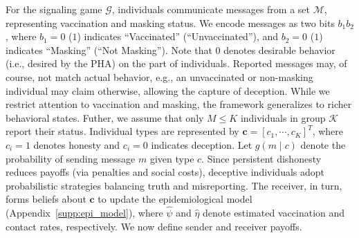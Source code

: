 \documentclass[sigconf,review]{acmart}
\begin{document}
For the signaling game $\mathcal{G}$, individuals communicate messages from a set $\mathcal{M}$, representing vaccination and masking status.
We encode messages as two bits $b_1b_2$, where $b_1=0$ ($1$) indicates ``Vaccinated'' (``Unvaccinated''), and $b_2=0$ ($1$) indicates ``Masking'' (``Not Masking'').
Note that $0$ denotes desirable behavior (i.e., desired by the PHA) on the part of individuals.
Reported messages may, of course, not match actual behavior, e.g., an unvaccinated or non-masking individual may claim otherwise, allowing the
capture of deception.
While we restrict attention to vaccination and masking, the framework generalizes to richer behavioral states.
Futher, we assume that only $M \leq K$ individuals in group $\mathcal{K}$ report their status. Individual types are represented by $\boldsymbol{c} = [c_1,\cdots,c_K]^T$, where $c_i=1$ denotes honesty and $c_i=0$ indicates deception. Let $g(m\mid c)$ denote the probability of sending message $m$ given type $c$. Since persistent dishonesty reduces payoffs (via penalties and social costs), deceptive individuals adopt probabilistic strategies balancing truth and misreporting. The receiver, in turn, forms beliefs about $\boldsymbol{c}$ to update the epidemiological model (Appendix~\ref{supp:epi_model}), where $\widehat{\psi}$ and $\widehat{\eta}$ denote estimated vaccination and contact rates, respectively. We now define sender and receiver payoffs.
\end{document}
